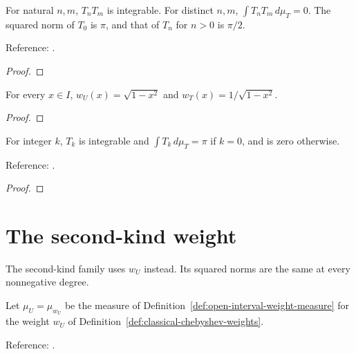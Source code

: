 \begin{theorem}
\label{thm:T-orthogonal}
\leanok
For natural $n,m$, $T_nT_m$ is integrable. For distinct $n,m$, $\int T_nT_m\,d\mu_T=0$.
The squared norm of $T_0$ is $\pi$, and that of $T_n$ for $n>0$ is $\pi/2$.

Reference: \cite[Table 18.3.1]{dlmf}.
\end{theorem}
\begin{proof}
\leanok
\end{proof}

\begin{supporting}

\begin{theorem}
\label{thm:classical-chebyshev-weights}
\leanok
For every $x\in I$, $w_U(x)=\sqrt{1-x^2}$ and $w_T(x)=1/\sqrt{1-x^2}$.
\end{theorem}
\begin{proof}
\leanok
\end{proof}

\begin{theorem}
\label{thm:T-moments}
\leanok
For integer $k$, $T_k$ is integrable and $\int T_k\,d\mu_T=\pi$ if $k=0$, and is zero otherwise.

Reference: \cite[Table 18.3.1]{dlmf}.
\end{theorem}
\begin{proof}
\leanok
\end{proof}

\end{supporting}

\section{The second-kind weight}\label{sec:textbook-weights-second-kind}

The second-kind family uses $w_U$ instead. Its squared norms are the same at every nonnegative degree.

\begin{definition}
\label{def:measureU}
\leanok
Let $\mu_U=\mu_{w_U}$ be the measure of Definition~\ref{def:open-interval-weight-measure}
for the weight $w_U$ of Definition~\ref{def:classical-chebyshev-weights}.

Reference: \cite[Table 18.3.1]{dlmf}.
\end{definition}


